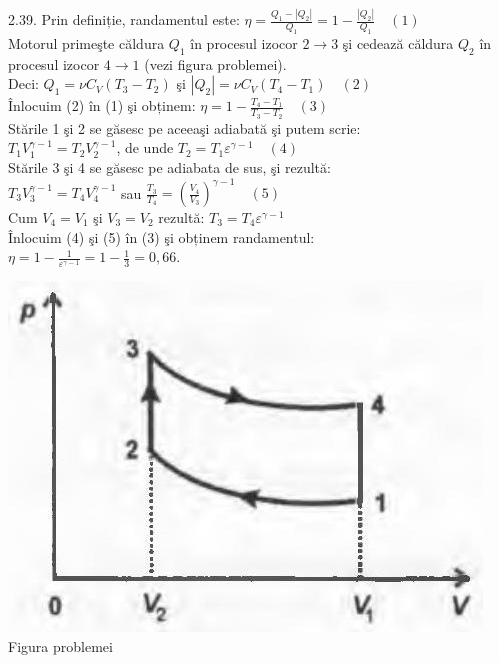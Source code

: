 2.39. Prin definiție, randamentul este: $\eta=\frac{Q_{1}-\left|Q_{2}\right|}{Q_{1}}=1-\frac{\left|Q_{2}\right|}{Q_{1}} \quad (1)$\\ Motorul primeşte căldura $Q_{1}$ în procesul izocor $2 \rightarrow 3$ şi cedează căldura $Q_{2}$ în procesul izocor $4 \rightarrow 1$ (vezi figura problemei).\\ Deci: $Q_{1}=\nu C_{V}\left(T_{3}-T_{2}\right)$ şi $\left|Q_{2}\right|=\nu C_{V}\left(T_{4}-T_{1}\right) \quad (2)$\\ Înlocuim (2) în (1) şi obținem: $\eta=1-\frac{T_{4}-T_{1}}{T_{3}-T_{2}} \quad (3)$\\ Stările 1 şi 2 se găsesc pe aceeaşi adiabată şi putem scrie:\\ $T_{1} V_{1}^{\gamma-1}=T_{2} V_{2}^{\gamma-1}$, de unde $T_{2}=T_{1} \varepsilon^{\gamma-1} \quad (4)$\\ Stările 3 şi 4 se găsesc pe adiabata de sus, şi rezultă:\\ $T_{3} V_{3}^{\gamma-1}=T_{4} V_{4}^{\gamma-1}$ sau $\frac{T_{3}}{T_{4}}=\left(\frac{V_{4}}{V_{3}}\right)^{\gamma-1} \quad (5)$\\ Cum $V_{4}=V_{1}$ şi $V_{3}=V_{2}$ rezultă: $T_{3}=T_{4} \varepsilon^{\gamma-1}$\\ Înlocuim (4) şi (5) în (3) şi obținem randamentul:\\ $\eta=1-\frac{1}{\varepsilon^{\gamma-1}}=1-\frac{1}{3}=0,66$.\\ \begin{center} \includegraphics[width=0.4\linewidth]{images/2025_07_01_5b3ff9fa0d508c8e9f17g-276}\\ Figura problemei \end{center}\\


